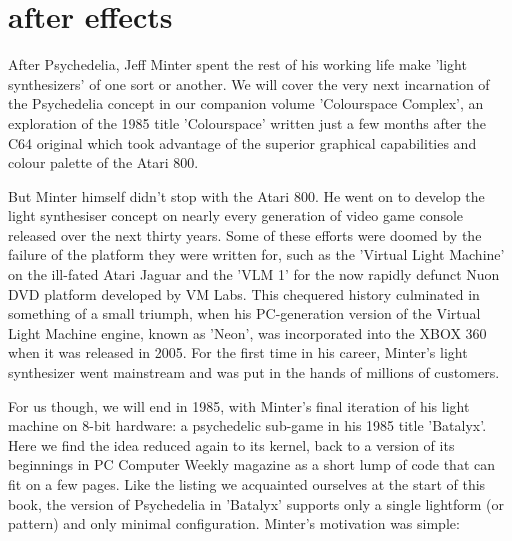 \chapter{after effects} 
\label{sec:patterns}
\lstset{style=6502Style}
\lstset{ 
   aboveskip=5pt,
   belowskip=0pt,
}
After Psychedelia, Jeff Minter spent the rest of his working life make 'light synthesizers' of one sort or another. We will cover the very next incarnation of the
Psychedelia concept in our companion volume 'Colourspace Complex', an exploration of the 1985 title 'Colourspace' written just a few months after the C64 original
which took advantage of the superior graphical capabilities and colour palette of the Atari 800. 

But Minter himself didn't stop with the Atari 800. He went on to develop the light
synthesiser concept on nearly every generation of video game console released
over the next thirty years. Some of these efforts were doomed by the failure of
the platform they were written for, such as the 'Virtual Light Machine' on the
ill-fated Atari Jaguar and the 'VLM 1' for the now rapidly defunct Nuon DVD platform developed by
VM Labs. This chequered history culminated in something of a small triumph, when his PC-generation version of the Virtual Light Machine engine, known as 'Neon',
was incorporated into the XBOX 360 when it was released in 2005. For the first time in his career, Minter's light synthesizer went mainstream and was put in the
hands of millions of customers.

For us though, we will end in 1985, with Minter's final iteration of his light machine on 8-bit hardware: a psychedelic sub-game in his 1985 title 'Batalyx'. Here
we find the idea reduced again to its kernel, back to a version of its beginnings in PC Computer Weekly magazine as a short lump of code that can fit on a few pages.
Like the listing we acquainted ourselves at the start of this book, the version of Psychedelia in 'Batalyx' supports only a single lightform (or pattern) and only
minimal configuration. Minter's motivation was simple:



